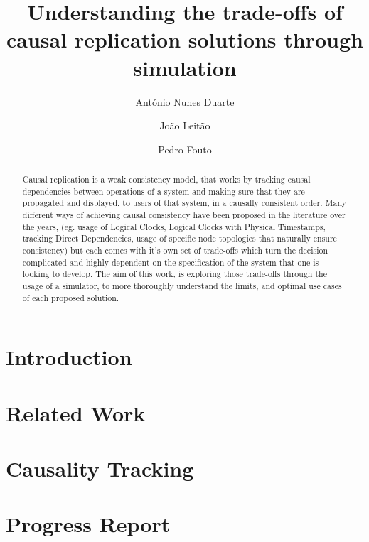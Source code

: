 \documentclass[runningheads]{llncs}
\begin{document}
%
\title{Understanding the trade-offs of causal replication solutions through simulation}
%
%
\author{António Nunes Duarte \and
João Leitão \and
Pedro Fouto}
%
%
%
\maketitle              %
%
\begin{abstract}
Causal replication is a weak consistency model, that works by 
tracking causal dependencies between operations of a system and making sure that they are propagated
and displayed, to users of that system, in a causally consistent order.
Many different ways of achieving causal consistency have been proposed in the literature
over the years, (eg. usage of Logical Clocks\cite{baquero2016logical}, 
Logical Clocks with Physical Timestamps\cite{roohitavaf2017causalspartan,du2014gentlerain}, tracking Direct Dependencies\cite{lloyd2011don}, 
	usage of specific node topologies that naturally ensure consistency\cite{van2020intrinsic})
but each comes with it's own set of trade-offs which turn the decision complicated 
and	highly dependent on the specification of the system that one is looking to develop. The aim of this work, is 
exploring those trade-offs through the usage of a simulator, to more thoroughly understand the limits,
and optimal use cases of each proposed solution.

\end{abstract}

\section{Introduction}

\section{Related Work}

\section{Causality Tracking}

\section{Progress Report}

%
%
%
% 
% 
%



\end{document}
